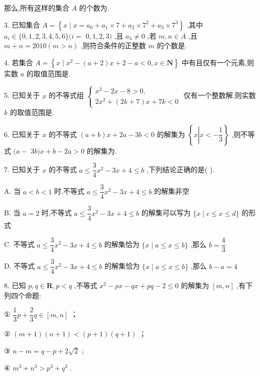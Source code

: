 那么,所有这样的集合 $A$ 的个数为\blkda{}.

3. 已知集合 $A = \left\{  {x \mid  x = {a}_{0} + {a}_{1} \times  7 + {a}_{2} \times  {7}^{2} + {a}_{3} \times  {7}^{3}}\right\}$ ,其中 ${a}_{i} \in  \{ 0,1,2,3,4,5,6\} (i =$  $0,1,2,3)$ ,且 ${a}_{3} \neq  0$ ,若 $m,n \in  A$ ,且 $m + n = {2010}\left( {m > n}\right)$ ,则符合条件的正整数 $m$ 的个数是\blkda{}.

4. 若集合 $A = \left\{  {x \mid  {x}^{2} - \left( {a + 2}\right) x + 2 - a < 0,x \in  \mathbf{N}}\right\}$ 中有且仅有一个元素,则实数 $a$ 的取值范围是\blkda{}.

5. 已知关于 $x$ 的不等式组 $\left\{  \begin{array}{l} {x}^{2} - {2x} - 8 > 0, \\  2{x}^{2} + \left( {{2k} + 7}\right) x + {7k} < 0 \end{array}\right.$ 仅有一个整数解,则实数 $k$ 的取值范围是\blkda{}.

6. 已知关于 $x$ 的不等式 $\left( {a + b}\right) x + {2a} - {3b} < 0$ 的解集为 $\left\{  {x\left| {x <  - \dfrac{1}{3}}\right. }\right\}$ ,则不等式 $(a -$  ${3b})x + b - {2a} > 0$ 的解集为\blkda{}.

7. 已知关于 $x$ 的不等式 $a \leq  \dfrac{3}{4}{x}^{2} - {3x} + 4 \leq  b$ ,下列结论正确的是(   ).

A. 当 $a < b < 1$ 时,不等式 $a \leq  \dfrac{3}{4}{x}^{2} - {3x} + 4 \leq  b$ 的解集非空

B. 当 $a = 2$ 时,不等式 $a \leq  \dfrac{3}{4}{x}^{2} - {3x} + 4 \leq  b$ 的解集可以写为 $\{ x \mid  c \leq  x \leq  d\}$ 的形式

C. 不等式 $a \leq  \dfrac{3}{4}{x}^{2} - {3x} + 4 \leq  b$ 的解集恰为 $\{ x \mid  a \leq  x \leq  b\}$ ,那么 $b = \dfrac{4}{3}$

D. 不等式 $a \leq  \dfrac{3}{4}{x}^{2} - {3x} + 4 \leq  b$ 的解集恰为 $\{ x \mid  a \leq  x \leq  b\}$ ,那么 $b - a = 4$

8. 已知 $p,q \in  \mathbf{R},p < q$ ,不等式 ${x}^{2} - {px} - {qx} + {pq} - 2 \leq  0$ 的解集为 $\left\lbrack  {m,n}\right\rbrack$ ,有下列四个命题:

① $\dfrac{1}{3}p + \dfrac{2}{3}q \in  \left\lbrack  {m,n}\right\rbrack$ ；

② $\left( {m + 1}\right) \left( {n + 1}\right)  < \left( {p + 1}\right) \left( {q + 1}\right)$ ；

③ $n - m = q - p + 2\sqrt{2}$ ;

④ ${m}^{3} + {n}^{3} > {p}^{3} + {q}^{3}$ .


